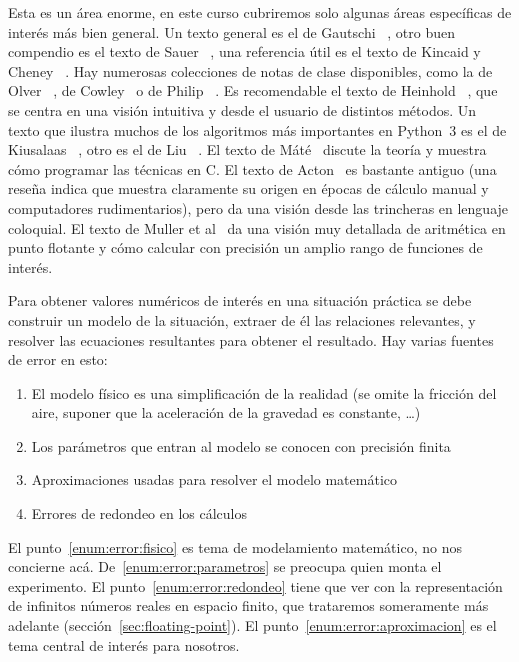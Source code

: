   Esta es un área enorme,
  en este curso cubriremos solo algunas áreas específicas
  de interés más bien general.
  Un texto general es el de Gautschi~%
    \cite{gautschi12:_numerical_analysis},
  otro buen compendio es el texto de Sauer~%
    \cite{sauer11:_numerical_analysis},
  una referencia útil es el texto de Kincaid y Cheney~%
    \cite{kincaid02:_numerical_analysis}.
  Hay numerosas colecciones de notas de clase disponibles,
  como la de Olver~%
    \cite{olver08:_ln_numerical_analysis},
  de Cowley~%
    \cite{cowley14:_numerical_analysis}
  o de Philip~%
    \cite{philip22:_num_math_i,philip22:_num_math_ii}.
  Es recomendable el texto de Heinhold~%
    \cite{heinhold13:_intuitive_guide_numer_methods},
  que se centra en una visión intuitiva
  y desde el usuario de distintos métodos.
  Un texto que ilustra muchos de los algoritmos más importantes
  en Python~3
  es el de Kiusalaas~%
    \cite{kiusalaas13:_numerical_meth_python3},
  otro es el de Liu~%
    \cite{liu20:_first_semes_num_anal_python}.
  El texto de Máté~%
    \cite{mate04:_intro_numerical_analysis_c}
  discute la teoría y muestra cómo programar las técnicas en C.
  El texto de Acton~%
    \cite{acton90:_numer_methods_usual_work}
  es bastante antiguo
  (una reseña indica que muestra claramente su origen en épocas
   de cálculo manual y computadores rudimentarios),
  pero da una visión desde las trincheras en lenguaje coloquial.
  El texto de Muller et al~%
    \cite{muller18:_handb_float_point_arith}
  da una visión muy detallada de aritmética en punto flotante
  y cómo calcular con precisión un amplio rango de funciones de interés.

  Para obtener valores numéricos de interés en una situación práctica
  se debe construir un modelo de la situación,
  extraer de él las relaciones relevantes,
  y resolver las ecuaciones resultantes para obtener el resultado.
  Hay varias fuentes de error en esto:
  \begin{enumerate}[label={(\roman*)}]
  \item
    \label{enum:error:fisico}
    El modelo físico es una simplificación de la realidad
    (se omite la fricción del aire,
     suponer que la aceleración de la gravedad es constante,
     \ldots)
   \item
    \label{enum:error:parametros}
     Los parámetros que entran al modelo se conocen con precisión finita
   \item
    \label{enum:error:aproximacion}
     Aproximaciones usadas para resolver el modelo matemático
   \item
    \label{enum:error:redondeo}
     Errores de redondeo en los cálculos
  \end{enumerate}
  El punto~\ref{enum:error:fisico} es tema de modelamiento matemático,
  no nos concierne acá.
  De~\ref{enum:error:parametros} se preocupa quien monta el experimento.
  El punto~\ref{enum:error:redondeo} tiene que ver con la representación
  de infinitos números reales en espacio finito,
  que trataremos someramente más adelante
  (sección~\ref{sec:floating-point}).
  El punto~\ref{enum:error:aproximacion} es el tema central de interés
  para nosotros.


